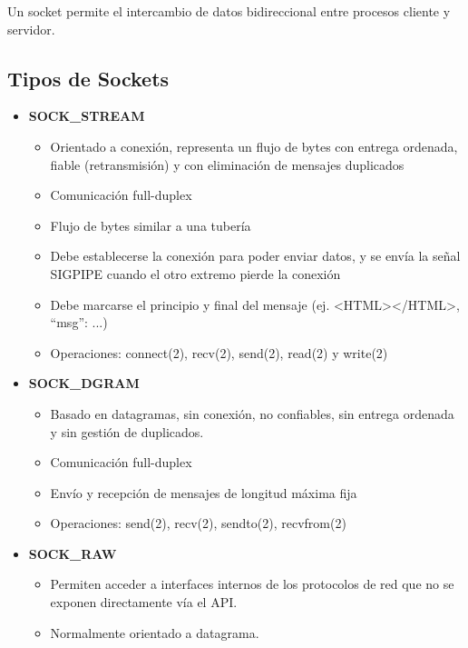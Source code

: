 Un socket permite el intercambio de datos bidireccional entre procesos cliente y servidor.
\subsection{Tipos de Sockets}
\begin{itemize}
    \item \textbf{SOCK\_STREAM}
    \begin{itemize}
        \item Orientado a conexión, representa un flujo de bytes con entrega ordenada, fiable (retransmisión) y con eliminación de mensajes duplicados
        \item Comunicación full-duplex
        \item Flujo de bytes similar a una tubería
        \item Debe establecerse la conexión para poder enviar datos, y se envía la señal SIGPIPE cuando el otro extremo pierde la conexión
        \item Debe marcarse el principio y final del mensaje (ej. <HTML></HTML>, { “msg”: {...}})
        \item Operaciones: connect(2), recv(2), send(2), read(2) y write(2)
    \end{itemize}
    
    \item \textbf{SOCK\_DGRAM}
    \begin{itemize}
        \item Basado en datagramas, sin conexión, no confiables, sin entrega ordenada y sin gestión de duplicados.
        \item Comunicación full-duplex
        \item Envío y recepción de mensajes de longitud máxima fija
        \item Operaciones: send(2), recv(2), sendto(2), recvfrom(2)
    \end{itemize}
    
    \item \textbf{SOCK\_RAW}
    \begin{itemize}
        \item Permiten acceder a interfaces internos de los protocolos de red que no se exponen directamente vía el API.
        \item Normalmente orientado a datagrama.
    \end{itemize}
\end{itemize}